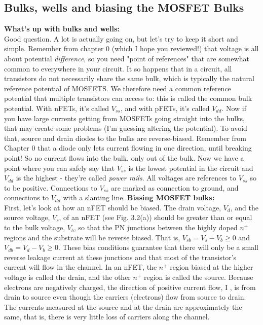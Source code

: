 \subsection{Bulks, wells and biasing the MOSFET Bulks}
\newline \newline
\textbf{What's up with bulks and wells:} \\
Good question. A lot is actually going on, but let's try to keep it short and simple. Remember from chapter 0 (which I hope you reviewed!) that voltage is all about potential \emph{difference}, so you need "point of references" that are somewhat common to everywhere in your circuit. It so happens that in a circuit, all transistors do not necessarily share the same bulk, which is typically the natural reference potential of MOSFETS. We therefore need a common reference potential that multiple transistors can access to: this is called the common bulk potential. With nFETs, it's called $V_{ss}$, and with pFETs, it's called $V_{dd}$. Now if you have large currents getting from MOSFETs going straight into the bulks, that may create some problems (I'm guessing altering the potential). To avoid that, source and drain diodes to the bulks are reverse-biased. Remember from Chapter 0 that a diode only lets current flowing in one direction, until breaking point! So no current flows into the bulk, only out of the bulk. Now we have a point where you can safely say that $V_{ss}$ is the lowest potential in the circuit and $V_{dd}$ is the highest - they're called \emph{power rails}. All voltages are references to $V_{ss}$ so to be positive. Connections to $V_{ss}$ are marked as connection to ground, and connections to $V_{dd}$ with a slanting line. 
\newline \newline
\textbf{Biasing MOSFET bulks:} \\
First, let's look at how an nFET should be biased. The drain voltage, $V_d$, and the source voltage, $V_s$, of an nFET (see Fig. 3.2(a)) should be greater than or equal to the bulk voltage, $V_b$, so that the PN junctions between the highly doped $n^+$ regions and the substrate will be reverse biased. That is, $V_{sb} = V_s - V_b \geq  0$ and$V_{db} = V_d - V_b \geq  0$. These bias conditions guarantee that there will only be a small reverse leakage current at these junctions and that most of the transistor’s current will flow in the channel. In an nFET, the $n^+$
region biased at the higher voltage is called the drain, and the other $n^+$ region is called the source. Because electrons are negatively charged, the direction of positive current flow, I , is from drain to source even though the carriers (electrons) flow from source to drain. The currents measured at the source and at the drain are approximately the same, that is, there is very little loss of carriers along the channel. \ 
